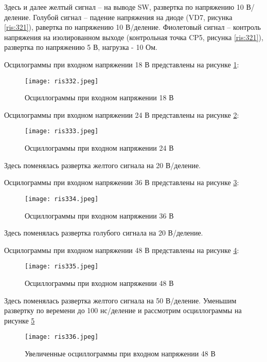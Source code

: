 Здесь и далее желтый сигнал -- на выводе SW, развертка по напряжению 10 В/деление. Голубой сигнал -- падение 
напряжения на диоде (VD7, рисунка \ref{ris:321}), равертка по напряжению 10 В/деление. Фиолетовый сигнал -- 
контроль напряжения на изолированном выходе (контрольная точка CP5, рисунка \ref{ris:321}), развертка
по напряжению 5 В, нагрузка - 10 Ом. 

Осцилограммы при входном напряжении 18 В представлены на рисунке \ref{ris:332}:

\begin{figure}[H]
    \centering
    \texttt{[image: ris332.jpeg]}
    \caption{Осциллограммы при входном напряжении 18 В}
    \label{ris:332}
\end{figure}

Осцилограммы при входном напряжении 24 В представлены на рисунке \ref{ris:333}:

\begin{figure}[H]
    \centering
    \texttt{[image: ris333.jpeg]}
    \caption{Осциллограммы при входном напряжении 24 В}
    \label{ris:333}
\end{figure}

Здесь поменялась развертка желтого сигнала на 20 В/деление. 

Осцилограммы при входном напряжении 36 В представлены на рисунке \ref{ris:334}:

\begin{figure}[H]
    \centering
    \texttt{[image: ris334.jpeg]}
    \caption{Осциллограммы при входном напряжении 36 В}
    \label{ris:334}
\end{figure}

Здесь поменялась развертка голубого сигнала на 20 В/деление. 

Осцилограммы при входном напряжении 48 В представлены на рисунке \ref{ris:335}:

\begin{figure}[H]
    \centering
    \texttt{[image: ris335.jpeg]}
    \caption{Осциллограммы при входном напряжении 48 В}
    \label{ris:335}
\end{figure}

Здесь поменялась развертка желтого сигнала на 50 В/деление. Уменьшим развертку по веремени до 100 нс/деление
и рассмотрим осциллограммы на рисунке \ref{ris:336}


\begin{figure}[H]
    \centering
    \texttt{[image: ris336.jpeg]}
    \caption{Увеличенные осциллограммы при входном напряжении 48 В}
    \label{ris:336}
\end{figure}


